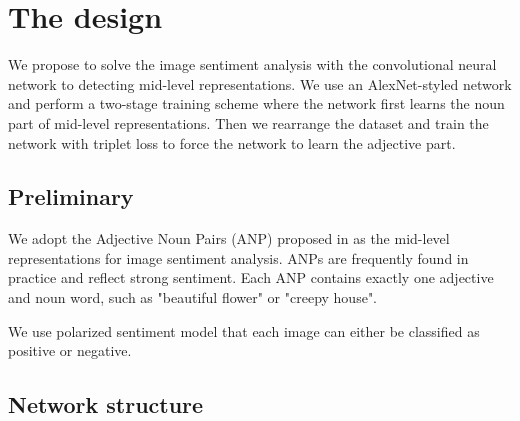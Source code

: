 \section{The design}
\label{design}

We propose to solve the image sentiment analysis with the convolutional neural network to detecting mid-level representations. We use an AlexNet-styled network and perform a two-stage training scheme where the network first learns the noun part of mid-level representations. Then we rearrange the dataset and train the network with triplet loss to force the network to learn the adjective part. 

\subsection{Preliminary}
We adopt the Adjective Noun Pairs (ANP) proposed in \cite{borth2013large} as the mid-level representations for image sentiment analysis. ANPs are frequently found in practice and reflect strong sentiment. Each ANP contains exactly one adjective and noun word, such as "beautiful flower" or "creepy house". 

We use polarized sentiment model that each image can either be classified as positive or negative. 

\subsection{Network structure}

